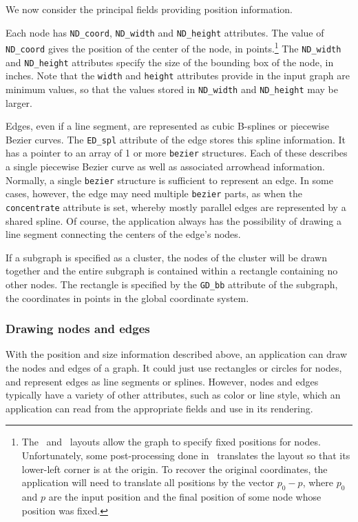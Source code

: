We now consider the principal fields providing position information.

Each node has {\tt ND\_coord}, {\tt ND\_width} and {\tt ND\_height} 
attributes. The value
of {\tt ND\_coord} gives the position of the center of the node, 
in points.\footnote{
The \neato\ and \fdp\ layouts allow the graph to specify fixed positions
for nodes. Unfortunately, some post-processing done in \gviz\ translates
the layout so that its lower-left corner is at the origin. To recover
the original coordinates, the application will need to translate all positions
by the vector $p_0 - p$, where $p_0$ and $p$ are the input position and
the final position of some node whose position was fixed.
} 
The {\tt ND\_width} and {\tt ND\_height} attributes specify the size of the
bounding box of the node, in inches.
Note that the {\tt width} and {\tt height} attributes provide in the input
graph are minimum values, so that the values stored in {\tt ND\_width} 
and {\tt ND\_height} may be larger.

Edges, even if a line segment, are represented as cubic B-splines or
piecewise Bezier curves.
The {\tt ED\_spl} attribute of the edge stores this spline information.
It has a pointer to an array of 1 or more {\tt bezier} structures. Each
of these describes a single piecewise Bezier curve as well as associated
arrowhead information. Normally, a single {\tt bezier} structure is
sufficient to represent an edge. In some cases, however, 
the edge may need multiple {\tt bezier} parts, as when the {\tt concentrate}
attribute is set, whereby mostly parallel edges are represented by a
shared spline.
Of course, the application always has the possibility of drawing a line
segment connecting the centers of the edge's nodes.

If a subgraph is specified as a cluster, the nodes of the cluster
will be drawn together and the entire subgraph is contained within
a rectangle containing no other nodes. The rectangle is specified by
the {\tt GD\_bb} attribute of the subgraph, the coordinates in points in
the global coordinate system.

\subsubsection{Drawing nodes and edges}
\label{sec:nodes}

With the position and size information described above, an application 
can draw the nodes and edges of a graph. It could just use rectangles 
or circles for nodes, and represent edges as line segments or splines.
However, nodes and edges typically have a variety of other attributes,
such as color or line style, which an application can read from the
appropriate fields and use in its rendering.

